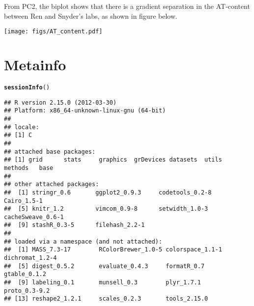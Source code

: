 \documentclass{article}\usepackage{graphicx, color}
\makeatletter
\newcommand{\hlfunctioncall}[1]{\textcolor[rgb]{0.501960784313725,0,0.329411764705882}{\textbf{#1}}}%
\newenvironment{kframe}{%
 \def\at@end@of@kframe{}%
 \ifinner\ifhmode%
  \def\at@end@of@kframe{\end{minipage}}%
  \begin{minipage}{\columnwidth}%
 \fi\fi%
 \def\FrameCommand##1{\hskip\@totalleftmargin \hskip-\fboxsep
 \colorbox{shadecolor}{##1}\hskip-\fboxsep
     \hskip-\linewidth \hskip-\@totalleftmargin \hskip\columnwidth}%
 \MakeFramed {\advance\hsize-\width
   \@totalleftmargin\z@ \linewidth\hsize
   \@setminipage}}%
 {\par\unskip\endMakeFramed%
 \at@end@of@kframe}
\newenvironment{knitrout}{}{} %
\makeatother
\begin{document}
From PC2, the biplot shows that there is a gradient separation in the AT-content between Ren and Snyder's labs, as shown in figure below.

\begin{figure*}
  \texttt{[image: figs/AT\_content.pdf]}
\end{figure*}
\pagebreak


\section{Metainfo}
\begin{knitrout}
\color{fgcolor}\begin{kframe}
\begin{alltt}
\hlfunctioncall{sessionInfo}()
\end{alltt}
\begin{verbatim}
## R version 2.15.0 (2012-03-30)
## Platform: x86_64-unknown-linux-gnu (64-bit)
## 
## locale:
## [1] C
## 
## attached base packages:
## [1] grid      stats     graphics  grDevices datasets  utils     methods   base     
## 
## other attached packages:
##  [1] stringr_0.6       ggplot2_0.9.3     codetools_0.2-8   Cairo_1.5-1      
##  [5] knitr_1.2         vimcom_0.9-8      setwidth_1.0-3    cacheSweave_0.6-1
##  [9] stashR_0.3-5      filehash_2.2-1   
## 
## loaded via a namespace (and not attached):
##  [1] MASS_7.3-17        RColorBrewer_1.0-5 colorspace_1.1-1   dichromat_1.2-4   
##  [5] digest_0.5.2       evaluate_0.4.3     formatR_0.7        gtable_0.1.2      
##  [9] labeling_0.1       munsell_0.3        plyr_1.7.1         proto_0.3-9.2     
## [13] reshape2_1.2.1     scales_0.2.3       tools_2.15.0
\end{verbatim}
\end{kframe}
\end{knitrout}
\end{document}
